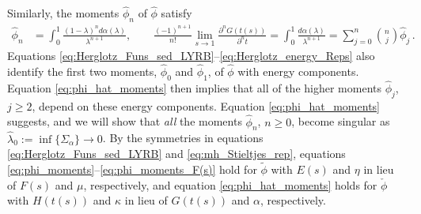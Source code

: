 \documentclass[english,12pt,jmp,graphicx]{revtex4-1}
\newcommand{\ph}{\hat{\phi}}
\begin{document}
Similarly, the moments $\ph_n$ of $\ph$ satisfy
%
\begin{align}\label{eq:phi_hat_moments}
  \ph_n%
      &=\int_0^1\frac{(1-\lambda)^nd\alpha(\lambda)}{\lambda^{n+1}}, \qquad
      \frac{(-1)^{n+1}}{n!}\lim_{s\to1}\frac{\partial^nG(t(s))}{\partial^nt}
         =\int_0^1\frac{d\alpha(\lambda)}{\lambda^{n+1}}
          =\sum_{j=0}^n{n \choose j} \ph_j\,.
\end{align}
%
Equations
\eqref{eq:Herglotz_Funs_sed_LYRB}--\eqref{eq:Herglotz_energy_Reps}
also identify the first two moments, $\ph_0$ and $\ph_1$, of
$\ph$ with energy components. Equation \eqref{eq:phi_hat_moments} then
implies that all of the higher moments $\ph_j$, $j\geq2$, depend on these
energy components. Equation \eqref{eq:phi_hat_moments} suggests, and
we will show that \emph{all} the moments $\ph_n$, $n\geq0$, become
singular as $\hat{\lambda}_0:=\inf\{\Sigma_\alpha\}\to0$. By the symmetries in equations
\eqref{eq:Herglotz_Funs_sed_LYRB} and \eqref{eq:mh_Stieltjes_rep},
equations \eqref{eq:phi_moments}--\eqref{eq:phi_moments_F(s)} hold for
$\tilde{\phi}$ with $E(s)$ and $\eta$ in lieu of $F(s)$ and $\mu$,
respectively, and equation \eqref{eq:phi_hat_moments} holds for
$\check{\phi}$ with $H(t(s))$ and $\kappa$ in lieu of $G(t(s))$ and $\alpha$,
respectively.
\end{document}
